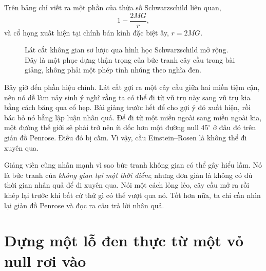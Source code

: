 Trên bảng chỉ viết ra một phần của thừa số Schwarzschild liên quan,
\begin{equation}
1-\frac{2MG}{r},
\end{equation}
và cổ họng xuất hiện tại chính bán kính đặc biệt ấy, \(r=2MG\).

\begin{figure}[htbp]
\centering
{}
\caption{Lát cắt không gian sơ lược qua hình học Schwarzschild mở rộng. Đây là một phục dựng thận trọng của bức tranh cây cầu trong bài giảng, không phải một phép tính nhúng theo nghĩa đen.}
\end{figure}

Bây giờ đến phần hiệu chỉnh. Lát cắt gợi ra một cây cầu giữa hai miền tiệm cận, nên nó dễ làm nảy sinh ý nghĩ rằng ta có thể đi từ vũ trụ này sang vũ trụ kia bằng cách băng qua cổ hẹp. Bài giảng trước hết để cho gợi ý đó xuất hiện, rồi bác bỏ nó bằng lập luận nhân quả. Để đi từ một miền ngoài sang miền ngoài kia, một đường thế giới sẽ phải trở nên ít dốc hơn một đường null \(45^\circ\) ở đâu đó trên giản đồ Penrose. Điều đó bị cấm. Vì vậy, cầu Einstein--Rosen là không thể đi xuyên qua.

Giảng viên cũng nhấn mạnh vì sao bức tranh không gian có thể gây hiểu lầm. Nó là bức tranh của \emph{không gian tại một thời điểm}; nhưng đơn giản là không có đủ thời gian nhân quả để đi xuyên qua. Nói một cách lỏng lẻo, cây cầu mở ra rồi khép lại trước khi bất cứ thứ gì có thể vượt qua nó. Tốt hơn nữa, ta chỉ cần nhìn lại giản đồ Penrose và đọc ra câu trả lời nhân quả.

\section{Dựng một lỗ đen thực từ một vỏ null rơi vào}

